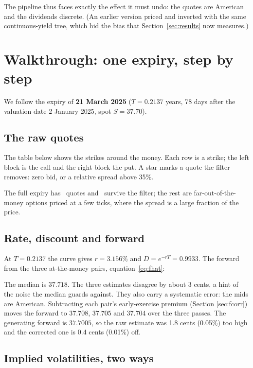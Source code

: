 \documentclass[11pt]{article}
\begin{document}
\noindent The pipeline thus faces exactly the effect it must undo: the quotes are
American and the dividends discrete. (An earlier version priced and inverted with
the same continuous-yield tree, which hid the bias that Section~\ref{sec:results}
now measures.)

\section{Walkthrough: one expiry, step by step}\label{sec:walkthrough}

We follow the expiry of \textbf{21 March 2025} ($T=0.2137$ years, 78 days after the
valuation date 2 January 2025, spot $S=37.70$).

\subsection{The raw quotes}

The table below shows the strikes around the money. Each row is a strike; the left
block is the call and the right block the put. A star marks a quote the filter
removes: zero bid, or a relative spread above 35\%.



The full expiry has \nRaw\ quotes and \nPass\ survive the filter; the rest are
far-out-of-the-money options priced at a few ticks, where the spread is a large
fraction of the price.

\subsection{Rate, discount and forward}

At $T=0.2137$ the curve gives $r=3.156\%$ and $D=e^{-rT}=0.9933$. The forward
from the three at-the-money pairs, equation~\eqref{eq:fhat}:



The median is $37.718$. The three estimates disagree by about 3 cents, a hint of
the noise the median guards against. They also carry a systematic error: the
mids are American. Subtracting each pair's early-exercise premium (Section
\ref{sec:fcorr}) moves the forward to $37.708$, $37.705$ and $37.704$ over the
three passes. The generating forward is $37.7005$, so the raw estimate was
1.8 cents (0.05\%) too high and the corrected one is 0.4 cents (0.01\%) off.

\subsection{Implied volatilities, two ways}
\end{document}
